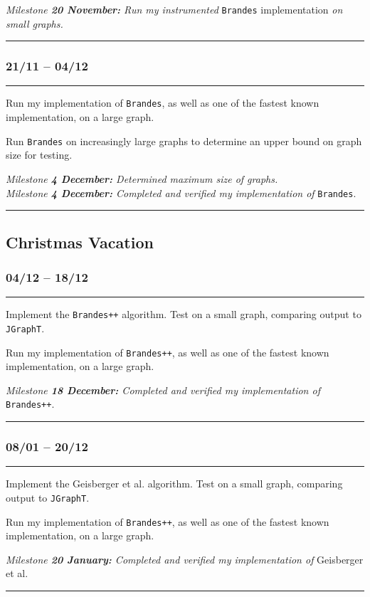 \documentclass[a4paper,12pt]{article}
\begin{document}
\noindent
\textit{Milestone \textbf{20 November:} Run my instrumented} \verb|Brandes| implementation \textit{on small graphs.}\\
\hrule

\subsubsection*{21/11 -- 04/12}\hrule

\noindent
Run my implementation of \verb|Brandes|, as well as one of the fastest known implementation, on a large graph.

\noindent
Run \verb|Brandes| on increasingly large graphs to determine an upper bound on graph size for testing.

\noindent
\textit{Milestone \textbf{4 December:} Determined maximum size of graphs.}\\
\textit{Milestone \textbf{4 December:} Completed and verified my implementation of} \verb|Brandes|.\\
\hrule

\subsection*{Christmas Vacation}
\subsubsection*{04/12 -- 18/12}\hrule
Implement the \verb|Brandes++| algorithm. Test on a small graph, comparing output to \verb|JGraphT|.

\noindent
Run my implementation of \verb|Brandes++|, as well as one of the fastest known implementation, on a large graph.

\noindent
\textit{Milestone \textbf{18 December:} Completed and verified my implementation of} \verb|Brandes++|.\\
\hrule

\subsubsection*{08/01 -- 20/12}\hrule
Implement the Geisberger et al. algorithm. Test on a small graph, comparing output to \verb|JGraphT|.

\noindent
Run my implementation of \verb|Brandes++|, as well as one of the fastest known implementation, on a large graph.

\noindent
\textit{Milestone \textbf{20 January:} Completed and verified my implementation of} Geisberger et al.\\
\hrule
\end{document}
